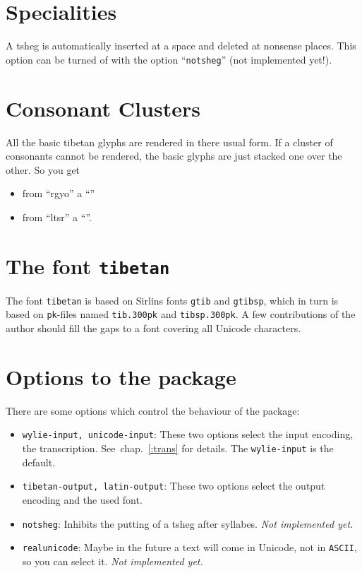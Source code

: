 \documentclass{article}
\begin{document}
\section{Specialities}
A tsheg is automatically inserted at a space and
deleted at nonsense places. This option can be turned of with the
option ``\texttt{notsheg}'' (not implemented yet!).

\section{Consonant Clusters}
All the basic tibetan glyphs are rendered in there usual form. If a
cluster of consonants cannot be rendered, the basic glyphs are just
stacked one over the other. So you get
\begin{itemize}
\item from ``rgyo'' a ``''
\item from ``ltsr'' a ``''.
\end{itemize}

\section{The font \texttt{tibetan}\label{:font}}
The font \texttt{tibetan} is based on Sirlins fonts \texttt{gtib} and
\texttt{gtibsp}, which in turn is based on \texttt{pk}-files named
\texttt{tib.300pk} and \texttt{tibsp.300pk}. A few contributions of the
author should fill the gaps to a font covering all Unicode characters.

\section{Options to the package\label{:options}}
There are some options which control the behaviour of the package:
\begin{itemize}
  \item \texttt{wylie-input, unicode-input}: These two options select
    the input encoding, the transcription. See~chap.~\ref{:trans} for
    details. The \texttt{wylie-input} is the default.
  \item \texttt{tibetan-output, latin-output}: These two options select the
    output encoding and the used font.
  \item \texttt{notsheg}: Inhibits the putting of a tsheg after
    syllabes. \emph{Not implemented yet.}
  \item \texttt{realunicode}: Maybe in the future a text will come
    in Unicode, not in \texttt{ASCII}, so you can select it. \emph{Not
    implemented yet.}
\end{itemize}
\end{document}
